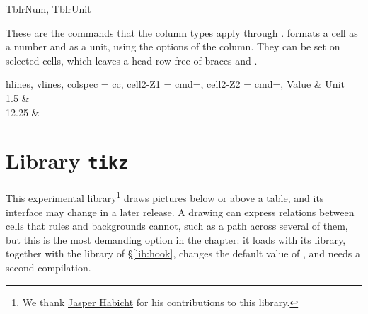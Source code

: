 \begin{codedescribe}[
        code,
        new=2021M
    ]{TblrNum, TblrUnit}
    \begin{codesyntax}
          
          
    \end{codesyntax}
    These are the commands that the column types apply through .  formats a cell as a number and  as a unit, using the  options of the column. They can be set on selected cells, which leaves a head row free of braces and .

    \begin{codestore}[st=lib:si:cmd]
        \begin{tblr}{
                hlines, vlines, colspec = {cc},
                cell{2-Z}{1} = {cmd=\TblrNum},
                cell{2-Z}{2} = {cmd=\TblrUnit},
            }
            Value & Unit        \\
            1.5   & \kilo\metre \\
            12.25 & \second
        \end{tblr}\end{codestore}
    \begin{center}
    \end{center}
\end{codedescribe}

\section{Library \texttt{tikz}}\label{lib:tikz}
This experimental library\footnote{We thank \href{https://github.com/jasperhabicht}{Jasper Habicht} for his contributions to this library.} draws  pictures below or above a table, and its interface may change in a later release. A drawing can express relations between cells that rules and backgrounds cannot, such as a path across several of them, but this is the most demanding option in the chapter: it loads  with its  library, together with the  library of \S\ref{lib:hook}, changes the default value of , and needs a second compilation.

